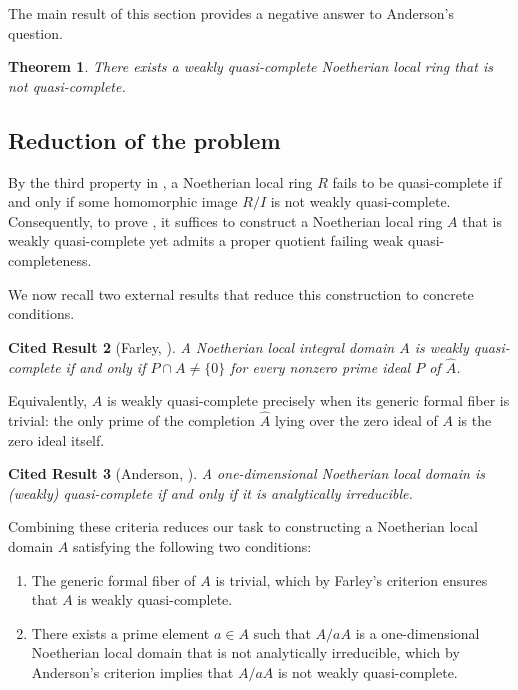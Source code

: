 \documentclass[]{pkuai4m}
\theoremstyle{plain}
\newtheorem{theorem}{Theorem}
\newtheorem{cited}[theorem]{Cited Result}
\theoremstyle{definition}
\begin{document}
The main result of this section provides a negative answer to Anderson's question.

\begin{theorem}\label{thm:main-appendix}
There exists a weakly quasi-complete Noetherian local ring that is not quasi-complete.
\end{theorem}

\subsection*{Reduction of the problem}

By the third property in , a Noetherian local ring $R$ fails to be quasi-complete if and only if some homomorphic image $R/I$ is not weakly quasi-complete. Consequently, to prove , it suffices to construct a Noetherian local ring $A$ that is weakly quasi-complete yet admits a proper quotient failing weak quasi-completeness.

We now recall two external results that reduce this construction to concrete conditions.

\begin{cited}[{Farley, \cite[Proposition 1]{farley2016quasi}}]
A Noetherian local integral domain $A$ is weakly quasi-complete if and only if $P \cap A \neq \{0\}$ for every nonzero prime ideal $P$ of $\widehat A$.
\end{cited}

Equivalently, $A$ is weakly quasi-complete precisely when its generic formal fiber is trivial: the only prime of the completion $\widehat A$ lying over the zero ideal of $A$ is the zero ideal itself.

\begin{cited}[{Anderson, \cite[Corollary 2.2]{anderson2014quasi}}]

A one-dimensional Noetherian local domain is (weakly) quasi-complete if and only if it is analytically irreducible.
\end{cited}

Combining these criteria reduces our task to constructing a Noetherian local domain $A$ satisfying the following two conditions:

\begin{enumerate}[leftmargin=*]
\item[A.] The generic formal fiber of $A$ is trivial, which by Farley's criterion ensures that $A$ is weakly quasi-complete.
\item[B.] There exists a prime element $a \in A$ such that $A/aA$ is a one-dimensional Noetherian local domain that is not analytically irreducible, which by Anderson's criterion implies that $A/aA$ is not weakly quasi-complete.
\end{enumerate}
\end{document}
